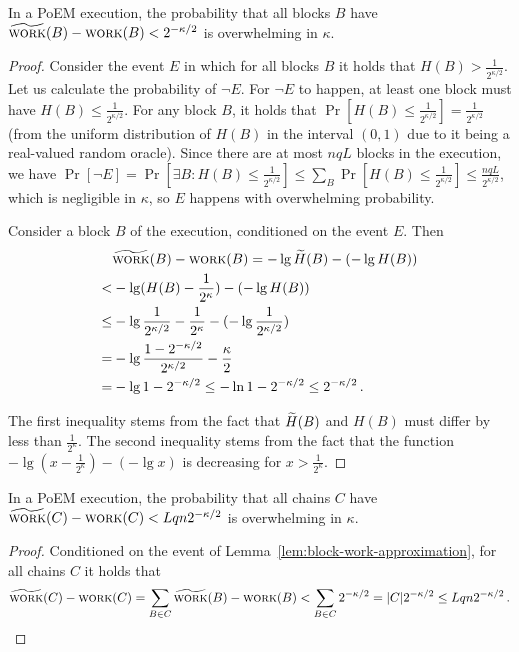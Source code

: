 \begin{lemma}\label{lem:block-work-approximation}
  In a PoEM execution, the probability that all blocks $B$
  have $\widetilde{\textsc{work}}(B) - \textsc{work}(B) < 2^{-\kappa/2}$
  is overwhelming in $\kappa$.
\end{lemma}
\begin{proof}
  Consider the event $E$ in which for all blocks $B$ it holds that
  $H(B) > \frac{1}{2^{\kappa/2}}$.
  Let us calculate the probability of $\lnot E$. For $\lnot E$ to happen,
  at least one block must have $H(B) \leq \frac{1}{2^{\kappa/2}}$.
  For any block $B$, it holds that $\Pr[H(B) \leq \frac{1}{2^{\kappa/2}}] = \frac{1}{2^{\kappa/2}}$ (from the
  uniform distribution of $H(B)$ in the interval $(0, 1)$ due to it being a real-valued random oracle).
  Since there are at most $nqL$ blocks in the execution, we have
  $\Pr[\lnot E] = \Pr[\exists B: H(B) \leq \frac{1}{2^{\kappa/2}}] \leq \sum_B \Pr[H(B) \leq \frac{1}{2^{\kappa/2}}] \leq \frac{nqL}{2^{\kappa/2}}$,
  which is negligible in $\kappa$,
  so $E$ happens with overwhelming probability.

  Consider a block $B$ of the execution, conditioned on the event $E$.
  Then
  \begin{align*}
        &\widetilde{\textsc{work}}(B) - \textsc{work}(B) = -\lg \widetilde{H}(B) - (-\lg H(B))\\
       <& -\lg(H(B) - \frac{1}{2^\kappa}) - (-\lg H(B))\\
    \leq& -\lg{\frac{1}{2^{\kappa/2}} - \frac{1}{2^\kappa}} - (-\lg{\frac{1}{2^{\kappa/2}}})\\
       =& -\lg\frac{1 - 2^{-\kappa/2}}{2^{\kappa/2}} - \frac{\kappa}{2} \\
       =& -\lg{1 - 2^{-\kappa/2}} \leq -\ln{1 - 2^{-\kappa/2}} \leq 2^{-\kappa/2}\,.
  \end{align*}

  The first inequality stems from the fact that $\widetilde{H}(B)$ and $H(B)$ must
  differ by less than $\frac{1}{2^\kappa}$. The second inequality stems from
  the fact that the function $-\lg(x - \frac{1}{2^\kappa}) - (-\lg x)$ is
  decreasing for $x > \frac{1}{2^\kappa}$.
  \Qed
\end{proof}

\begin{corollary}\label{cor:chain-work-approximation}
  In a PoEM execution, the probability that all chains $C$
  have $\widetilde{\textsc{work}}(C) - \textsc{work}(C) < Lqn 2^{-\kappa/2}$
  is overwhelming in $\kappa$.
\end{corollary}
\begin{proof}
  Conditioned on the event of Lemma~\ref{lem:block-work-approximation}, for all
  chains $C$ it holds that
  \begin{align*}
    \widetilde{\textsc{work}}(C) - \textsc{work}(C) = \sum_{B \in C}{\widetilde{\textsc{work}}(B) - \textsc{work}(B)}
    < \sum_{B \in C}{2^{-\kappa/2}} = |C| 2^{-\kappa/2} \leq Lqn 2^{-\kappa/2}\,.
  \end{align*}
  \Qed
\end{proof}

